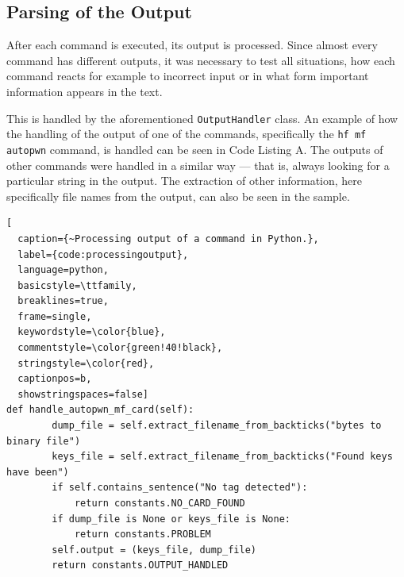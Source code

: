 \subsection{Parsing of the Output}

After each command is executed, its output is processed. Since almost every command has different outputs, it was necessary to test all situations, how each command reacts for example to incorrect input or in what form important information appears in the text. 

This is handled by the aforementioned \texttt{OutputHandler} class. An example of how the handling of the output of one of the commands, specifically the \texttt{hf mf autopwn} command, is handled can be seen in Code Listing A. The outputs of other commands were handled in a similar way --- that is, always looking for a particular string in the output. The extraction of other information, here specifically file names from the output, can also be seen in the sample.

\begin{lstlisting}[
  caption={~Processing output of a command in Python.},
  label={code:processingoutput},
  language=python,
  basicstyle=\ttfamily,
  breaklines=true,
  frame=single, 
  keywordstyle=\color{blue},
  commentstyle=\color{green!40!black}, 
  stringstyle=\color{red},
  captionpos=b,
  showstringspaces=false]
def handle_autopwn_mf_card(self):
        dump_file = self.extract_filename_from_backticks("bytes to binary file")
        keys_file = self.extract_filename_from_backticks("Found keys have been")
        if self.contains_sentence("No tag detected"):
            return constants.NO_CARD_FOUND
        if dump_file is None or keys_file is None:
            return constants.PROBLEM
        self.output = (keys_file, dump_file)
        return constants.OUTPUT_HANDLED
\end{lstlisting}
